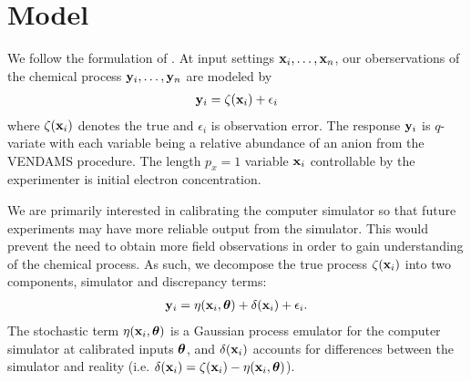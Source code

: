\section{Model}

We follow the formulation of \cite{higdon:2008}. At input settings $\mathbf{\bm{x}}_i,\ldots,\mathbf{\bm{x}}_n$, our oberservations of the chemical process $\mathbf{\bm{y}}_i,\ldots,\mathbf{\bm{y}}_n$ are modeled by
\begin{eqnarray}
\mathbf{\bm{y}}_i = \zeta(\mathbf{\bm{x}}_i) + \epsilon_i
\end{eqnarray}
where $\zeta(\mathbf{\bm{x}}_i)$ denotes the true and $\epsilon_i$ is observation error. The response $\mathbf{\bm{y}}_i$ is $q$-variate with each variable being a relative abundance of an anion from the VENDAMS procedure. The length $p_x=1$ variable $\mathbf{\bm{x}}_i$ controllable by the experimenter is initial electron concentration.

We are primarily interested in calibrating the computer simulator so that future experiments may have more reliable output from the simulator. This would prevent the need to obtain more field observations in order to gain understanding of the chemical process. As such, we decompose the true process $\zeta(\mathbf{\bm{x}}_i)$ into two components, simulator and discrepancy terms:
\begin{eqnarray}
\mathbf{\bm{y}}_i = \eta(\mathbf{\bm{x}}_i, \mathbf{\bm{\theta}}) + \delta(\mathbf{\bm{x}}_i) + \epsilon_i.
\end{eqnarray}
The stochastic term $\eta(\mathbf{\bm{x}}_i, \mathbf{\bm{\theta}})$ is a Gaussian process emulator for the computer simulator at calibrated inputs $\mathbf{\bm{\theta}}$, and $\delta(\mathbf{\bm{x}}_i)$ accounts for differences between the simulator and reality (i.e. $\delta(\mathbf{\bm{x}}_i) = \zeta(\mathbf{\bm{x}}_i) - \eta(\mathbf{\bm{x}}_i, \mathbf{\bm{\theta}})$).
